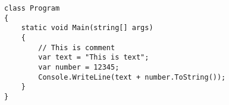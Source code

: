 \documentclass[11pt]{article}
\begin{document}
\begin{lstlisting}[float, caption={Sample code}]
class Program
{
    static void Main(string[] args)
    {
        // This is comment
        var text = "This is text";
        var number = 12345;
        Console.WriteLine(text + number.ToString());
    }
}
\end{lstlisting}
\end{document}
